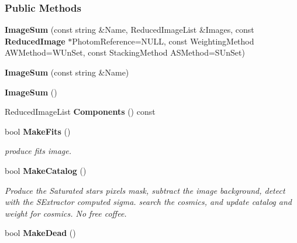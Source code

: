 \subsubsection*{Public Methods}
\begin{CompactItemize}
\item 
{}
{\bf Image\-Sum} (const string \&Name, Reduced\-Image\-List \&Images, const {\bf Reduced\-Image} $\ast$Photom\-Reference=NULL, const Weighting\-Method AWMethod=WUn\-Set, const Stacking\-Method ASMethod=SUn\-Set)\label{class_imagesum_a0}

\item 
{}
{\bf Image\-Sum} (const string \&Name)\label{class_imagesum_a1}

\item 
{}
{\bf Image\-Sum} ()\label{class_imagesum_a2}

\item 
{}
Reduced\-Image\-List {\bf Components} () const\label{class_imagesum_a3}

\item 
{}
bool {\bf Make\-Fits} ()\label{class_imagesum_a4}

\begin{CompactList}\small\item\em produce fits image.\item\end{CompactList}\item 
{}
bool {\bf Make\-Catalog} ()\label{class_imagesum_a5}

\begin{CompactList}\small\item\em Produce the Saturated stars pixels mask, subtract the image background, detect with the SExtractor computed sigma. search the cosmics, and update catalog and weight for cosmics. No free coffee.\item\end{CompactList}\item 
{}
bool {\bf Make\-Dead} ()\label{class_imagesum_a6}


\end{CompactItemize}
